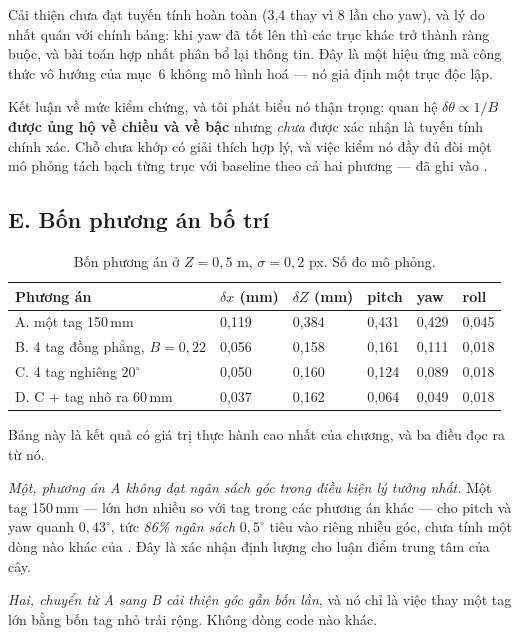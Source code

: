 \documentclass[../../marker.tex]{subfiles}
\begin{document}
Cải thiện chưa đạt tuyến tính hoàn toàn (3,4 thay vì 8 lần cho yaw), và lý do nhất quán với chính bảng: khi yaw đã tốt lên thì các trục khác trở thành ràng buộc, và bài toán hợp nhất phân bổ lại thông tin. Đây là một hiệu ứng mà công thức vô hướng của  mục~6 không mô hình hoá --- nó giả định một trục độc lập.

Kết luận về mức kiểm chứng, và tôi phát biểu nó thận trọng: quan hệ \(\delta\theta \propto 1/B\) \textbf{được ủng hộ về chiều và về bậc} nhưng \emph{chưa} được xác nhận là tuyến tính chính xác. Chỗ chưa khớp có giải thích hợp lý, và việc kiểm nó đầy đủ đòi một mô phỏng tách bạch từng trục với baseline theo cả hai phương --- đã ghi vào .

\subsection{E. Bốn phương án bố trí}

\begin{table}[H]\centering\small
\caption{Bốn phương án ở \(Z = 0{,}5\) m, \(\sigma = 0{,}2\) px. Số đo mô phỏng.}
\label{tab:c16-layouts}
\begin{tabularx}{\linewidth}{@{}L{4.3cm}L{1.5cm}L{1.5cm}L{1.4cm}L{1.4cm}Y@{}}
\toprule
Phương án & \(\delta x\) (mm) & \(\delta Z\) (mm) & pitch & yaw & roll\\
\midrule
A. một tag 150\,mm & 0,119 & 0,384 & 0,431 & 0,429 & 0,045\\
B. 4 tag đồng phẳng, \(B=0{,}22\) & 0,056 & 0,158 & 0,161 & 0,111 & 0,018\\
C. 4 tag nghiêng \(20^\circ\) & 0,050 & 0,160 & 0,124 & 0,089 & 0,018\\
D. C + tag nhô ra 60\,mm & 0,037 & 0,162 & 0,064 & 0,049 & 0,018\\
\bottomrule
\end{tabularx}
\end{table}

Bảng này là kết quả có giá trị thực hành cao nhất của chương, và ba điều đọc ra từ nó.

\emph{Một, phương án A không đạt ngân sách góc trong điều kiện lý tưởng nhất.} Một tag 150\,mm --- lớn hơn nhiều so với tag trong các phương án khác --- cho pitch và yaw quanh \(0{,}43^\circ\), tức \emph{86\% ngân sách} \(0{,}5^\circ\) tiêu vào riêng nhiễu góc, chưa tính một dòng nào khác của . Đây là xác nhận định lượng cho luận điểm trung tâm của cây.

\emph{Hai, chuyển từ A sang B cải thiện góc gần bốn lần}, và nó chỉ là việc thay một tag lớn bằng bốn tag nhỏ trải rộng. Không dòng code nào khác.
\end{document}

